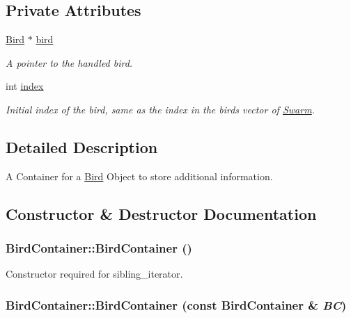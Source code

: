 \subsection*{Private Attributes}
\begin{CompactItemize}
\item 
\hyperlink{classBird}{Bird} $\ast$ \hyperlink{structBirdContainer_e4a43aeff071ae064cdae99f95e1e56f}{bird}
\begin{CompactList}\small\item\em A pointer to the handled bird. \item\end{CompactList}\item 
int \hyperlink{structBirdContainer_8e53df5bbf1ff5319498507e2711da61}{index}
\begin{CompactList}\small\item\em Initial index of the bird, same as the index in the birds vector of \hyperlink{classSwarm}{Swarm}. \item\end{CompactList}\end{CompactItemize}


\subsection{Detailed Description}
A Container for a \hyperlink{classBird}{Bird} Object to store additional information. 

\subsection{Constructor \& Destructor Documentation}
\hypertarget{structBirdContainer_9e8cbdab41d0be4a47c394a1ccbcb58c}{
\subsubsection{\setlength{\rightskip}{0pt plus 5cm}BirdContainer::BirdContainer ()}}
\label{structBirdContainer_9e8cbdab41d0be4a47c394a1ccbcb58c}


Constructor required for sibling\_\-iterator. 

\hypertarget{structBirdContainer_185db0ded7a97b6a4747b0f44664dafc}{
\subsubsection{\setlength{\rightskip}{0pt plus 5cm}BirdContainer::BirdContainer (const {\bf BirdContainer} \& {\em BC})}}
\label{structBirdContainer_185db0ded7a97b6a4747b0f44664dafc}


